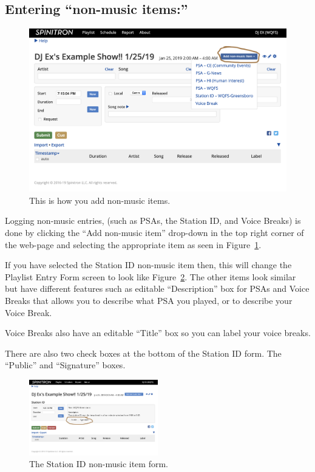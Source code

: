\documentclass[12pt]{article}
\begin{document}
\subsection{Entering ``non-music items:''}

\begin{figure}[h]
    \centering
    \includegraphics[width=1\textwidth]{images/Add_non-music.png}
    \caption{This is how you add non-music items.}
    \label{fig16}
\end{figure}


Logging non-music entries, (such as PSAs, the Station ID, and Voice Breaks) is done by clicking the ``Add non-music item'' drop-down in the top right corner of the web-page and selecting the appropriate item as seen in Figure~\ref{fig16}.


If you have selected the Station ID non-music item then, this will change the Playlist Entry Form screen to look like Figure~\ref{fig17}. 
The other items look similar but have different features such as editable ``Description'' box for PSAs and Voice Breaks that allows you to describe what PSA you played, or to describe your Voice Break. 

Voice Breaks also have an editable ``Title'' box so you can label your voice breaks.

There are also two check boxes at the bottom of the Station ID form. The ``Public'' and ``Signature'' boxes.

\begin{figure}
    \includegraphics[width=0.5\textwidth]{images/StationID.png}
    \caption{The Station ID non-music item form.}
    \label{fig17}
\end{figure}
\end{document}
